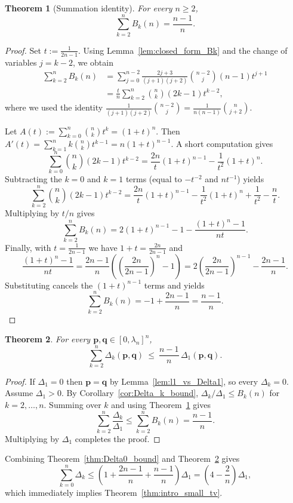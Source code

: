 \documentclass[11pt]{amsart}
\numberwithin{equation}{section}
\newtheorem{theorem}{Theorem}[section]
\theoremstyle{definition}
\newcommand{\vct}[1]{\mathbf{#1}}
\newcommand{\pvec}{\vct{p}}
\newcommand{\qvec}{\vct{q}}
\newcommand{\lam}{\lambda}
\begin{document}
\begin{theorem}[Summation identity]\label{thm:sum_Bk}
For every $n\ge 2$,
\[
\sum_{k=2}^n B_k(n)=\frac{n-1}{n}.
\]
\end{theorem}

\begin{proof}
Set $t:=\frac{1}{2n-1}$.
Using Lemma~\ref{lem:closed_form_Bk} and the change of variables $j=k-2$, we obtain
\begin{align*}
\sum_{k=2}^n B_k(n)
&=
\sum_{j=0}^{n-2}
\frac{2j+3}{(j+1)(j+2)}\binom{n-2}{j}(n-1)t^{j+1}\\
&=\frac{t}{n}
\sum_{k=2}^{n}\binom{n}{k}(2k-1)t^{k-2},
\end{align*}
where we used the identity
$\frac{1}{(j+1)(j+2)}\binom{n-2}{j}=\frac{1}{n(n-1)}\binom{n}{j+2}$.

Let $A(t):=\sum_{k=0}^n\binom{n}{k}t^k=(1+t)^n$.
Then $A'(t)=\sum_{k=1}^n k\binom{n}{k}t^{k-1}=n(1+t)^{n-1}$.
A short computation gives
\[
\sum_{k=0}^n\binom{n}{k}(2k-1)t^{k-2}
=\frac{2n}{t}(1+t)^{n-1}-\frac{1}{t^2}(1+t)^n.
\]
Subtracting the $k=0$ and $k=1$ terms (equal to $-t^{-2}$ and $nt^{-1}$) yields
\[
\sum_{k=2}^n\binom{n}{k}(2k-1)t^{k-2}
=\frac{2n}{t}(1+t)^{n-1}-\frac{1}{t^2}(1+t)^n+\frac{1}{t^2}-\frac{n}{t}.
\]
Multiplying by $t/n$ gives
\[
\sum_{k=2}^n B_k(n)=2(1+t)^{n-1}-1-\frac{(1+t)^n-1}{nt}.
\]
Finally, with $t=\frac{1}{2n-1}$ we have $1+t=\frac{2n}{2n-1}$ and
\[
\frac{(1+t)^n-1}{nt}
=\frac{2n-1}{n}\left(\left(\frac{2n}{2n-1}\right)^n-1\right)
=2\left(\frac{2n}{2n-1}\right)^{n-1}-\frac{2n-1}{n}.
\]
Substituting cancels the $(1+t)^{n-1}$ terms and yields
\[
\sum_{k=2}^n B_k(n)=-1+\frac{2n-1}{n}=\frac{n-1}{n}.
\]
\end{proof}

\begin{theorem}\label{thm:SMAL}
For every $\pvec,\qvec\in[0,\lam_n]^n$,
\[
\sum_{k=2}^n\Delta_k(\pvec,\qvec)\ \le\ \frac{n-1}{n}\,\Delta_1(\pvec,\qvec).
\]
\end{theorem}

\begin{proof}
If $\Delta_1=0$ then $\pvec=\qvec$ by Lemma~\ref{lem:l1_vs_Delta1}, so every $\Delta_k=0$.
Assume $\Delta_1>0$.
By Corollary~\ref{cor:Delta_k_bound},
$\Delta_k/\Delta_1\le B_k(n)$ for $k=2,\dots,n$.
Summing over $k$ and using Theorem~\ref{thm:sum_Bk} gives
\[
\sum_{k=2}^n\frac{\Delta_k}{\Delta_1}\le \sum_{k=2}^n B_k(n)=\frac{n-1}{n}.
\]
Multiplying by $\Delta_1$ completes the proof.
\end{proof}

Combining Theorem~\ref{thm:Delta0_bound} and Theorem~\ref{thm:SMAL} gives
\[
\sum_{k=0}^n\Delta_k
\le \left(1+\frac{2n-1}{n}+\frac{n-1}{n}\right)\Delta_1
=\left(4-\frac{2}{n}\right)\Delta_1,
\]
which immediately implies Theorem~\ref{thm:intro_small_tv}.
\end{document}

